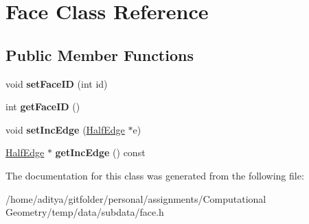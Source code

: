 \hypertarget{class_face}{}\section{Face Class Reference}
\label{class_face}
\subsection*{Public Member Functions}
\begin{DoxyCompactItemize}
\item 
\hypertarget{class_face_a9de4e636595445585536e98c391b07f5}{}void {\bfseries set\+Face\+I\+D} (int id)\label{class_face_a9de4e636595445585536e98c391b07f5}

\item 
\hypertarget{class_face_ac8e554d8fad3f6d357904d280ec1be2a}{}int {\bfseries get\+Face\+I\+D} ()\label{class_face_ac8e554d8fad3f6d357904d280ec1be2a}

\item 
\hypertarget{class_face_af1cdaee71ed88091bf019dbac8d9231a}{}void {\bfseries set\+Inc\+Edge} (\hyperlink{class_half_edge}{Half\+Edge} $\ast$e)\label{class_face_af1cdaee71ed88091bf019dbac8d9231a}

\item 
\hypertarget{class_face_ad82d80d3aacafd81fef5806391c54a67}{}\hyperlink{class_half_edge}{Half\+Edge} $\ast$ {\bfseries get\+Inc\+Edge} () const \label{class_face_ad82d80d3aacafd81fef5806391c54a67}

\end{DoxyCompactItemize}


The documentation for this class was generated from the following file\+:\begin{DoxyCompactItemize}
\item 
/home/aditya/gitfolder/personal/assignments/\+Computational Geometry/temp/data/subdata/face.\+h\end{DoxyCompactItemize}

